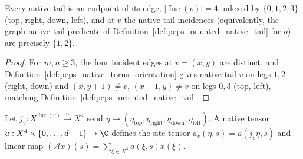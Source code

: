 \begin{lemma}%
    \label{thm:peps_native_torus_incidence}
    \leanok
    Every native tail is an endpoint of its edge, $|\operatorname{Inc}(v)|=4$
    indexed by $\{0,1,2,3\}$ (top, right, down, left), and at $v$ the native-tail
    incidences (equivalently, the graph native-tail predicate of
    Definition~\ref{def:peps_oriented_native_tail} for $o$) are precisely $\{1,2\}$.
\end{lemma}
\begin{proof}\leanok
    For $m,n\ge 3$, the four incident edges at $v=(x,y)$ are distinct, and
    Definition~\ref{def:peps_native_torus_orientation} gives native tail $v$ on
    legs $1,2$ (right, down) and $(x,y+1)\ne v$, $(x-1,y)\ne v$ on legs $0,3$
    (top, left), matching Definition~\ref{def:peps_oriented_native_tail}.
\end{proof}

\begin{definition}%
    \label{def:peps_native_incident_coordinates}
    \leanok
    Let $j_v:X^{\operatorname{Inc}(v)}\xrightarrow{\sim}X^4$ send
    $\eta\mapsto(\eta_{\mathrm{top}},\eta_{\mathrm{right}},\eta_{\mathrm{down}},\eta_{\mathrm{left}})$.
    A native tensor $a:X^4\times\{0,\ldots,d-1\}\to\C$ defines the site tensor
    $a_v(\eta,s)=a(j_v\eta,s)$ and linear map
    $(\mathcal A x)(s)=\sum_{\xi\in X^4}a(\xi,s)x(\xi)$.
\end{definition}

